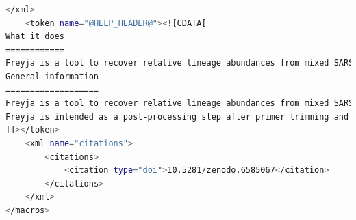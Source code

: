 \begin{lstlisting}[language=bash, caption=macros for collection of related Freyja tool wrappers, label=list:methods:wrapper-freyja-macros]
    </xml>
    <token name="@HELP_HEADER@"><![CDATA[
What it does
============
Freyja is a tool to recover relative lineage abundances from mixed SARS-CoV-2 samples from a sequencing dataset (BAM aligned to the Hu-1 reference).
General information
===================
Freyja is a tool to recover relative lineage abundances from mixed SARS-CoV-2 samples from a sequencing dataset (BAM aligned to the Hu-1 reference). The method uses lineage-determining mutational "barcodes" derived from the UShER global phylogenetic tree as a basis set to solve the constrained (unit sum, non-negative) de-mixing problem.
Freyja is intended as a post-processing step after primer trimming and variant calling in iVar (Grubaugh and Gangavaparu et al., 2019). From measurements of SNV freqency and sequencing depth at each position in the genome, Freyja returns an estimate of the true lineage abundances in the sample.
]]></token>
    <xml name="citations">
        <citations>
            <citation type="doi">10.5281/zenodo.6585067</citation>
        </citations>
    </xml>
</macros>
\end{lstlisting}
